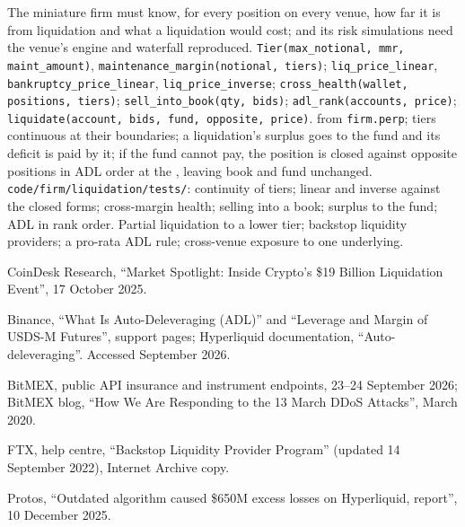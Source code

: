 \begin{build}
 The miniature firm must know, for every position on every venue, how far it is from liquidation and
what a liquidation would cost; and its risk simulations need the venue's engine and waterfall reproduced.
 \texttt{Tier(max\_notional, mmr, maint\_amount)}, \texttt{maintenance\_margin(notional, tiers)};
\texttt{liq\_price\_linear}, \texttt{bankruptcy\_price\_linear}, \texttt{liq\_price\_inverse};
\texttt{cross\_health(wallet, positions, tiers)}; \texttt{sell\_into\_book(qty, bids)}; \texttt{adl\_rank(accounts,
price)}; \texttt{liquidate(account, bids, fund, opposite, price)}.
  from \texttt{firm.perp}; tiers continuous at their boundaries; a liquidation's surplus goes to
the fund and its deficit is paid by it; if the fund cannot pay, the position is closed against opposite positions in ADL
order at the , leaving book and fund unchanged.
 \texttt{code/firm/liquidation/tests/}: continuity of tiers; linear and inverse  against the closed forms; cross-margin health; selling into a book; surplus to the fund; ADL in rank order.
 Partial liquidation to a lower tier; backstop liquidity providers; a pro-rata ADL rule; cross-venue
exposure to one underlying.
\end{build}

\begin{omsources}
\item CoinDesk Research, ``Market Spotlight: Inside Crypto's \$19 Billion Liquidation Event'', 17 October 2025.
\item Binance, ``What Is Auto-Deleveraging (ADL)'' and ``Leverage and Margin of USDS-M Futures'', support pages;
Hyperliquid documentation, ``Auto-deleveraging''. Accessed September 2026.
\item BitMEX, public API insurance and instrument endpoints, 23--24 September 2026; BitMEX blog, ``How We Are Responding to the 13 March
DDoS Attacks'', March 2020.
\item FTX, help centre, ``Backstop Liquidity Provider Program'' (updated 14 September 2022), Internet Archive copy.
\item Protos, ``Outdated algorithm caused \$650M excess losses on Hyperliquid, report'', 10 December 2025.
\end{omsources}

